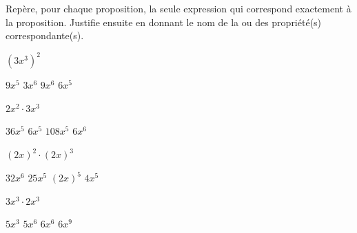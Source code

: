 %
%
Repère, pour chaque proposition, la seule expression qui correspond exactement à la proposition. Justifie ensuite en donnant le nom de la ou des propriété(s) correspondante(s).
	\begin{tasks}
		\task $(3x^3)^2$
		\begin{qcm}[4]
			\choice $9x^5$
			\choice $3x^6$
			\choice $9x^6$
			\choice $6x^5$
		\end{qcm}
		\dotfillbox[\linewidth]\par\dotfillbox[\linewidth]
		\task $2x^2\cdot 3x^3$
		\begin{qcm}[4]
			\choice $36x^5$
			\choice $6x^5$
			\choice $108x^5$
			\choice $6x^6$
		\end{qcm}
		\dotfillbox[\linewidth]\par\dotfillbox[\linewidth]
		\task $(2x)^2\cdot (2x)^3$
		\begin{qcm}[4]
			\choice $32x^6$
			\choice $25x^5$
			\choice $(2x)^5$
			\choice $4x^5$
		\end{qcm}
		\dotfillbox[\linewidth]\par\dotfillbox[\linewidth]
		\task $3x^3\cdot 2x^3$
		\begin{qcm}[4]
			\choice $5x^3$
			\choice $5x^6$
			\choice $6x^6$
			\choice $6x^9$
		\end{qcm}
		\dotfillbox[\linewidth]\par\dotfillbox[\linewidth]
	\end{tasks}
